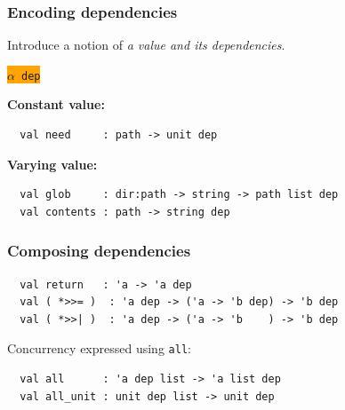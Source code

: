 \documentclass{beamer}
\begin{document}

\begin{frame}[fragile]
\frametitle{Encoding dependencies}
Introduce a notion of {\it a value and its dependencies}. \par
\begin{center}\colorbox{orange}{$\alpha$\ {\tt dep}}\end{center}
{\bf Constant value:}
{\footnotesize
\begin{verbatim}
  val need     : path -> unit dep
\end{verbatim}}
{\bf Varying value:}
{\footnotesize
\begin{verbatim}
  val glob     : dir:path -> string -> path list dep
  val contents : path -> string dep

\end{verbatim}}
\end{frame}


%


\begin{frame}[fragile]
\frametitle{Composing dependencies}
{\footnotesize
\begin{verbatim}
  val return   : 'a -> 'a dep
  val ( *>>= )  : 'a dep -> ('a -> 'b dep) -> 'b dep
  val ( *>>| )  : 'a dep -> ('a -> 'b    ) -> 'b dep
\end{verbatim}}
Concurrency expressed using {\tt all}:
{\footnotesize
\begin{verbatim}
  val all      : 'a dep list -> 'a list dep
  val all_unit : unit dep list -> unit dep

\end{verbatim}}
\end{frame}

%
%
\end{document}
